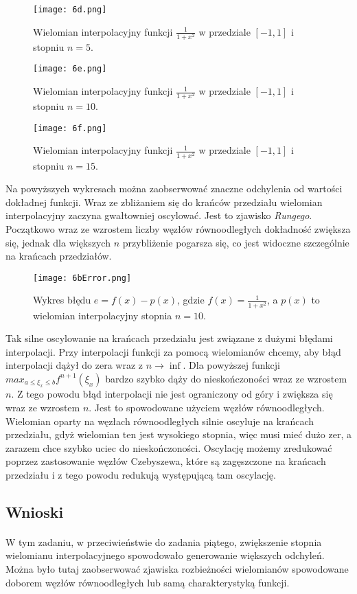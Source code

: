 \documentclass[a4paper]{article}
\theoremstyle{plain}
\begin{document}
\begin{figure}[!htb]
  \texttt{[image: 6d.png]}
  \caption{Wielomian interpolacyjny funkcji $\frac{1}{1 + x^2}$ w przedziale $[-1, 1]$ i stopniu $n = 5$.}
\endminipage\hfill
{}
  \texttt{[image: 6e.png]}
  \caption{Wielomian interpolacyjny funkcji $\frac{1}{1 + x^2}$ w przedziale $[-1, 1]$ i stopniu $n = 10$.}
\endminipage\hfill
{}%
  \texttt{[image: 6f.png]}
  \caption{Wielomian interpolacyjny funkcji $\frac{1}{1 + x^2}$ w przedziale $[-1, 1]$ i stopniu $n = 15$.}
\endminipage
\end{figure}

Na powyższych wykresach można zaobserwować znaczne odchylenia od wartości dokładnej funkcji. Wraz ze zbliżaniem się do krańców przedziału wielomian interpolacyjny zaczyna gwałtowniej oscylować. Jest to zjawisko \textit{Rungego}. Początkowo wraz ze wzrostem liczby węzłów równoodległych dokładność zwiększa się, jednak dla większych $n$ przybliżenie pogarsza się, co jest widoczne szczególnie na krańcach przedziałów.

\begin{figure}[htbp]
  \centering
  \texttt{[image: 6bError.png]}
  \caption{Wykres błędu $e = f(x) - p(x)$, gdzie $f(x) = \frac{1}{1 + x^2}$, a $p(x)$ to wielomian interpolacyjny stopnia $n = 10$.}
\end{figure}

Tak silne oscylowanie na krańcach przedziału jest związane z dużymi błędami interpolacji. Przy interpolacji funkcji za pomocą wielomianów chcemy, aby błąd interpolacji dążył do zera wraz z $n \to \inf$. Dla powyższej funkcji $ max_{a \leq \xi_{x} \leq b} f^{n + 1}(\xi_{x})$ bardzo szybko dąży do nieskończoności wraz ze wzrostem $n$. Z tego powodu błąd interpolacji nie jest ograniczony od góry i zwiększa się wraz ze wzrostem $n$. Jest to spowodowane użyciem węzłów równoodległych. Wielomian oparty na węzłach równoodległych silnie oscyluje na krańcach przedziału, gdyż wielomian ten jest wysokiego stopnia, więc musi mieć dużo zer, a zarazem chce szybko uciec do nieskończoności. Oscylację możemy zredukować poprzez zastosowanie węzłów Czebyszewa, które są zagęszczone na krańcach przedziału i z tego powodu redukują występującą tam oscylację. 

\subsection{Wnioski}
\paragraph{}
W tym zadaniu, w przeciwieństwie do zadania piątego, zwiększenie stopnia wielomianu interpolacyjnego spowodowało generowanie większych odchyleń. Można było tutaj zaobserwować zjawiska rozbieżności wielomianów spowodowane doborem węzłów równoodległych lub samą charakterystyką funkcji.
\end{document}
